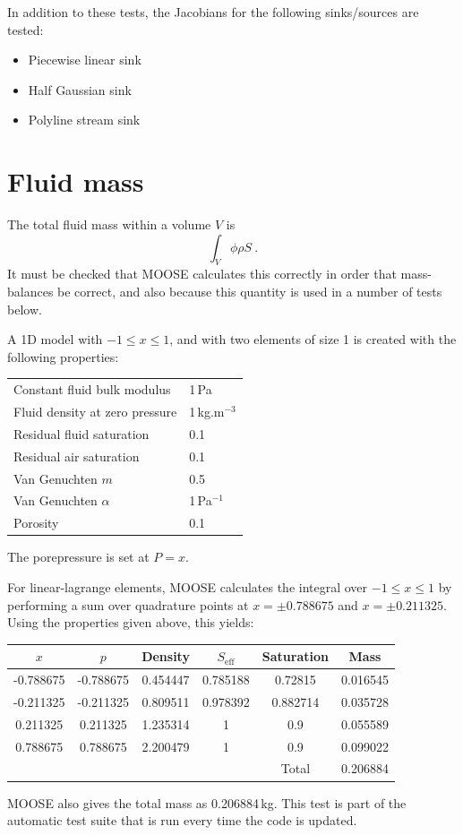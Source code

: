 \documentclass[]{scrreprt}
\begin{document}
In addition to these tests, the Jacobians for the following sinks/sources are tested:
\begin{itemize}
\item Piecewise linear sink
\item Half Gaussian sink
\item Polyline stream sink
\end{itemize}



\chapter{Fluid mass}
\label{ma}

The total fluid mass within a volume $V$ is
\begin{equation}
\int_{V} \phi\rho S \ .
\end{equation}
It must be checked that MOOSE calculates this correctly in order that
mass-balances be correct, and also because this quantity is used in a
number of tests below.

A 1D model with $-1\leq x \leq 1$, and with two elements of size 1 is
created with the following properties:
\begin{center}
\begin{tabular}{|ll|}
\hline
Constant fluid bulk modulus & 1\,Pa \\
Fluid density at zero pressure & 1\,kg.m$^{-3}$ \\
Residual fluid saturation & 0.1 \\
Residual air saturation & 0.1 \\
Van Genuchten $m$ & 0.5 \\
Van Genuchten $\alpha$ & 1\,Pa$^{-1}$ \\
Porosity & 0.1 \\
\hline
\end{tabular} 
\end{center}
The porepressure is set at $P=x$.

For linear-lagrange elements, MOOSE calculates the integral over
$-1\leq x \leq 1$ by performing a sum over quadrature points at
$x=\pm 0.788675$ and $x=\pm 0.211325$.
Using the properties given above, this yields:
\begin{center}
\begin{tabular}{|cccccc|}
\hline
$x$ & $p$ & Density & $S_{\mathrm{eff}}$ & Saturation & Mass \\
\hline
-0.788675 & -0.788675 & 0.454447 & 0.785188 & 0.72815 & 0.016545 \\
-0.211325 & -0.211325 & 0.809511 & 0.978392 & 0.882714 & 0.035728 \\
0.211325 & 0.211325 & 1.235314 & 1 & 0.9 & 0.055589 \\
0.788675 & 0.788675 & 2.200479 & 1 & 0.9 & 0.099022 \\
\hline
 & & & & Total & 0.206884 \\
\hline
\end{tabular} 
\end{center}
MOOSE also gives the total mass as 0.206884\,kg.  This test is part of
the automatic test suite that is run every time the code is updated.
\end{document}
